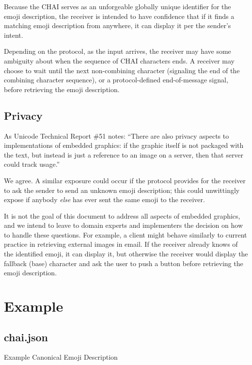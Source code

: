 \documentclass[12pt]{article}
\begin{document}
Because the CHAI serves as an unforgeable globally unique identifier
for the emoji description, the receiver is intended to have confidence
that if it finds a matching emoji description from anywhere, it can
display it per the sender's intent.

Depending on the protocol, as the input arrives, the receiver may have
some ambiguity about when the sequence of CHAI characters ends.  A
receiver may choose to wait until the next non-combining character
(signaling the end of the combining character sequence), or a
protocol-defined end-of-message signal, before retrieving the emoji
description.

\subsection{Privacy}

As Unicode Technical Report \#51 notes: ``There are also privacy
aspects to implementations of embedded graphics: if the graphic itself
is not packaged with the text, but instead is just a reference to an
image on a server, then that server could track usage.''\autocite[Section 8, ``Longer Term
  Solutions'']{UTR51}

We agree. A similar exposure could occur if the protocol provides
for the receiver to ask the sender to send an unknown emoji description;
this could unwittingly expose if anybody \emph{else} has ever sent the same
emoji to the receiver.

It is not the goal of this document to address all aspects of embedded
graphics, and we intend to leave to domain experts and implementers
the decision on how to handle these questions. For example, a client
might behave similarly to current practice in retrieving external
images in email. If the receiver already knows of the identified
emoji, it can display it, but otherwise the receiver would display the
fallback (base) character and ask the user to push a button before
retrieving the emoji description.

\section{Example}

\subsection{chai.json}

Example Canonical Emoji Description
\end{document}
